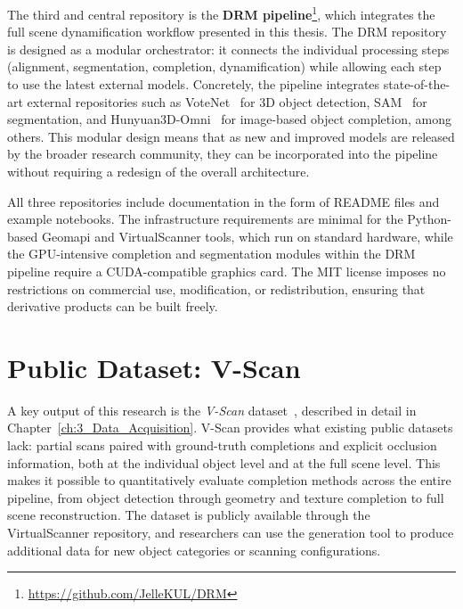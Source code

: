 The third and central repository is the \textbf{DRM pipeline}\footnote{\url{https://github.com/JelleKUL/DRM}}, which integrates the full scene dynamification workflow presented in this thesis. The DRM repository is designed as a modular orchestrator: it connects the individual processing steps (alignment, segmentation, completion, dynamification) while allowing each step to use the latest external models. Concretely, the pipeline integrates state-of-the-art external repositories such as VoteNet~\cite{qi_deep_2019} for 3D object detection, SAM~\cite{kirillov_segment_2023} for segmentation, and Hunyuan3D-Omni~\cite{hunyuan3d_hunyuan3d-omni_2025} for image-based object completion, among others. This modular design means that as new and improved models are released by the broader research community, they can be incorporated into the pipeline without requiring a redesign of the overall architecture.

All three repositories include documentation in the form of README files and example notebooks. The infrastructure requirements are minimal for the Python-based Geomapi and VirtualScanner tools, which run on standard hardware, while the GPU-intensive completion and segmentation modules within the DRM pipeline require a CUDA-compatible graphics card. The MIT license imposes no restrictions on commercial use, modification, or redistribution, ensuring that derivative products can be built freely.


\section{Public Dataset: V-Scan}
\label{sec:val_dataset}

A key output of this research is the \textit{V-Scan} dataset~\cite{vermandere_synthetic_2026}, described in detail in Chapter~\ref{ch:3_Data_Acquisition}. V-Scan provides what existing public datasets lack: partial scans paired with ground-truth completions and explicit occlusion information, both at the individual object level and at the full scene level. This makes it possible to quantitatively evaluate completion methods across the entire pipeline, from object detection through geometry and texture completion to full scene reconstruction. The dataset is publicly available through the VirtualScanner repository, and researchers can use the generation tool to produce additional data for new object categories or scanning configurations.


